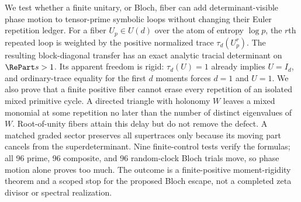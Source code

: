 We test whether a finite unitary, or Bloch, fiber can add determinant-visible
phase motion to tensor-prime symbolic loops without changing their Euler
repetition ledger.  For a fiber $U_p\in U(d)$ over the atom of entropy
$\log p$, the $r$th repeated loop is weighted by the positive normalized
trace $\tau_d(U_p^r)$.  The resulting block-diagonal transfer has an exact
analytic tracial determinant on $\RePart s>1$.  Its apparent freedom is
rigid: $\tau_d(U)=1$ already implies $U=I_d$, and ordinary-trace equality for
the first $d$ moments forces $d=1$ and $U=1$.  We also prove that a finite
positive fiber cannot erase every repetition of an isolated mixed primitive
cycle.  A directed triangle with holonomy $W$ leaves a mixed monomial at
some repetition no later than the number of distinct eigenvalues of $W$.
Root-of-unity fibers attain this delay but do not remove the defect.  A
matched graded sector preserves all supertraces only because its moving part
cancels from the superdeterminant.  Nine finite-control tests verify the
formulas; all 96 prime, 96 composite, and 96 random-clock Bloch trials move,
so phase motion alone proves too much.  The outcome is a finite-positive
moment-rigidity theorem and a scoped stop for the proposed Bloch escape, not
a completed zeta divisor or spectral realization.
